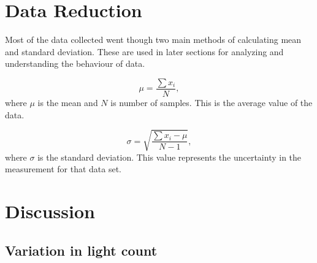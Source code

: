 \documentclass[a4paper,12pt]{article}
\begin{document}
\section{Data Reduction}
\label{sec:reduction}

Most of the data collected went though two main methods of calculating mean and standard deviation. These are used in later sections for analyzing and understanding the behaviour of data. 

\begin{equation}
\label{eq:mean}
\mu = \frac{\sum x_i}{N},
\end{equation}
where $\mu$ is the mean and $N$ is number of samples. This is the average value of the data.

\begin{equation}
\label{eq:SD}
\sigma = \sqrt{\frac{\sum x_i - \mu}{N-1}},
\end{equation}
where $\sigma$ is the standard deviation. This value represents the uncertainty in the measurement for that data set. 

\section{Discussion}
\label{sec:discussion}

\subsection{Variation in light count} 
\label{sec:light}
\end{document}
